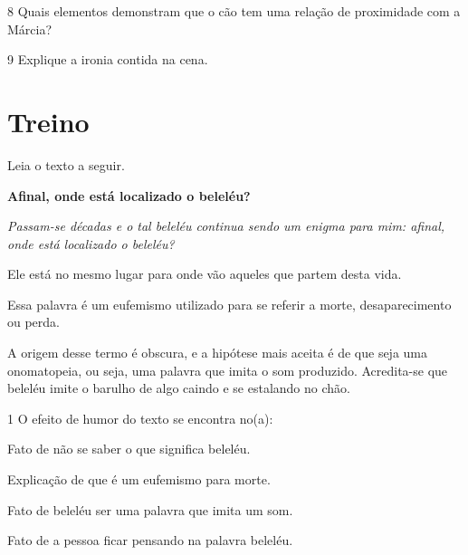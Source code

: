
\num{8} Quais elementos demonstram que o cão tem uma relação de
proximidade com a Márcia?


\num{9} Explique a ironia contida na cena.


\section*{Treino}

Leia o texto a seguir.

\begin{myquote}
\begin{center}
\textbf{Afinal, onde está localizado o beleléu?}

\noindent \emph{Passam-se décadas e o tal beleléu continua sendo um enigma para
mim: afinal, onde está localizado o beleléu?}
\end{center}
\medskip

\noindent Ele está no mesmo lugar para onde vão aqueles que partem desta vida.

Essa palavra é um eufemismo utilizado para se referir a morte,
desaparecimento ou perda.

A origem desse termo é obscura, e a hipótese mais aceita é de que seja
uma onomatopeia, ou seja, uma palavra que imita o som produzido.
Acredita-se que beleléu imite o barulho de algo caindo e se estalando no
chão.

\end{myquote}

\num{1} O efeito de humor do texto se encontra no(a):

\begin{escolha}
\item Fato de não se saber o que significa beleléu.
\item Explicação de que é um eufemismo para morte.
\item Fato de beleléu ser uma palavra que imita um som.
\item Fato de a pessoa ficar pensando na palavra beleléu. 
\end{escolha}


